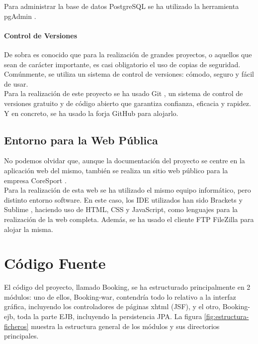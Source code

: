 Para administrar la base de datos PostgreSQL se ha utilizado la herramienta pgAdmin \cite{pgAdmin}.

\paragraph*{Control de Versiones}

De sobra es conocido que para la realización de grandes proyectos, o aquellos que sean de carácter importante, es casi obligatorio el uso de copias de seguridad. Comúnmente, se utiliza un sistema de control de versiones: cómodo, seguro y fácil de usar.\\

Para la realización de este proyecto se ha usado Git \cite{Git}, un sistema de control de versiones gratuito y de código abierto que garantiza confianza, eficacia y rapidez. Y en concreto, se ha usado la forja GitHub \cite{GitHub} para alojarlo.

\subsection{Entorno para la Web Pública}

No podemos olvidar que, aunque la documentación del proyecto se centre en la aplicación web del mismo, también se realiza un sitio web público para la empresa CoreSport \cite{CoreSport}.\\

Para la realización de esta web se ha utilizado el mismo equipo informático, pero distinto entorno software. En este caso, los IDE utilizados han sido Brackets \cite{Brackets} y Sublime \cite{Sublime}, haciendo uso de HTML, CSS y JavaScript, como lenguajes para la realización de la web completa. Además, se ha usado el cliente FTP FileZilla \cite{FileZilla} para alojar la misma.


\section{Código Fuente}

El código del proyecto, llamado Booking, se ha estructurado principalmente en 2 módulos: uno de ellos, Booking-war, contendría todo lo relativo a la interfaz gráfica, incluyendo los controladores de páginas xhtml (JSF), y el otro, Booking-ejb, toda la parte EJB, incluyendo la persistencia JPA. La figura \ref{fig:estructura-ficheros} muestra la estructura general de los módulos y sus directorios principales. 

